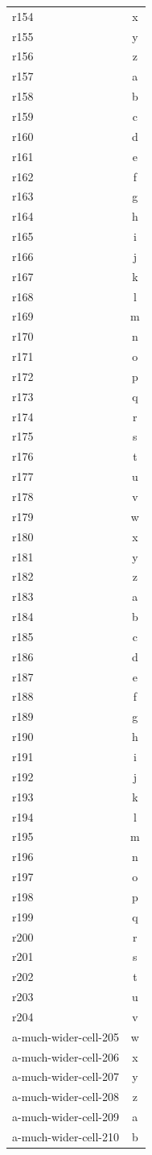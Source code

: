 \documentclass[12pt]{article}
\begin{document}
\begin{longtable}{lc}
r154 & x\\
r155 & y\\
r156 & z\\
r157 & a\\
r158 & b\\
r159 & c\\
r160 & d\\
r161 & e\\
r162 & f\\
r163 & g\\
r164 & h\\
r165 & i\\
r166 & j\\
r167 & k\\
r168 & l\\
r169 & m\\
r170 & n\\
r171 & o\\
r172 & p\\
r173 & q\\
r174 & r\\
r175 & s\\
r176 & t\\
r177 & u\\
r178 & v\\
r179 & w\\
r180 & x\\
r181 & y\\
r182 & z\\
r183 & a\\
r184 & b\\
r185 & c\\
r186 & d\\
r187 & e\\
r188 & f\\
r189 & g\\
r190 & h\\
r191 & i\\
r192 & j\\
r193 & k\\
r194 & l\\
r195 & m\\
r196 & n\\
r197 & o\\
r198 & p\\
r199 & q\\
r200 & r\\
r201 & s\\
r202 & t\\
r203 & u\\
r204 & v\\
a-much-wider-cell-205 & w\\
a-much-wider-cell-206 & x\\
a-much-wider-cell-207 & y\\
a-much-wider-cell-208 & z\\
a-much-wider-cell-209 & a\\
a-much-wider-cell-210 & b\\
\end{longtable}
\end{document}
